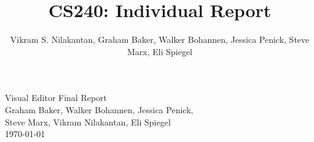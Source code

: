 \documentclass[a4paper]{article}
\title{CS240: Individual Report}
\author{Vikram S. Nilakantan, Graham Baker, Walker Bohannen, Jessica Penick, Steve Marx, Eli Spiegel}
\begin{document}

\begin{titlepage}
        \vspace*{\fill} %
        \begin{center}
                {\Huge Visual Editor Final Report}\\ [0.5cm]        
                
                {\Large Graham Baker, Walker Bohannen, Jessica Penick, \\Steve Marx, Vikram Nilakantan, Eli Spiegel}\\[0.4cm]
                \today %
        \end{center}
        \vspace*{\fill}
\end{titlepage}
\end{document}

